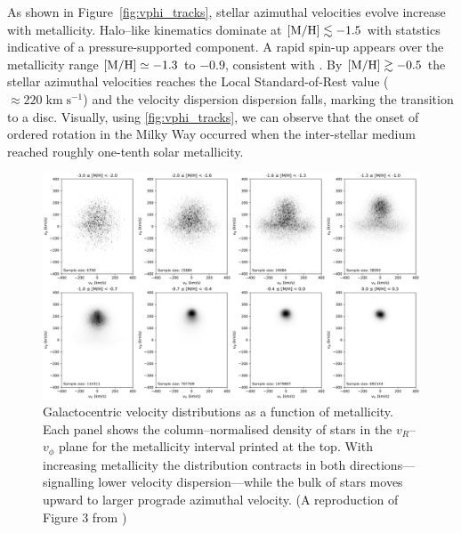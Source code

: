 \documentclass[a4paper,12pt]{article}
\begin{document}
As shown in Figure~\ref{fig:vphi_tracks}, stellar azimuthal velocities
evolve increase with metallicity.  Halo–like kinematics dominate at
${\rm [M/H]}\lesssim-1.5$ with statstics
indicative of a pressure-supported component.  A rapid spin-up appears over the 
metallicity range ${\rm [M/H]} \simeq -1.3$ to $-0.9$, consistent with \citet{Belokurov2022}.
By ${\rm [M/H]}\gtrsim-0.5$ the stellar azimuthal velocities reaches the Local
Standard-of-Rest value ($\approx220\;\mathrm{km\;s^{-1}}$) and the
velocity dispersion dispersion falls, marking the
transition to a disc.  Visually, using \ref{fig:vphi_tracks}, we can observe
that the onset of ordered rotation in the Milky Way occurred when the inter-stellar medium
reached roughly one-tenth solar metallicity.


\begin{figure}
  \centering
  \includegraphics[width=\textwidth]
                   {../figures/vphi_metallicity_histograms.png}
  \caption{Galactocentric velocity distributions as a function of metallicity.
           Each panel shows the column–normalised density of stars in the
           $v_R$–$v_\phi$ plane for the metallicity interval printed at the
           top. With increasing metallicity the distribution contracts in both
           directions—signalling lower velocity dispersion—while the bulk
           of stars moves upward to larger prograde azimuthal velocity.
           (A reproduction of Figure 3 from \citet{zhang2024existencemetalpoordiscmilky})
           }
  \label{fig:vRvphi_bins}
\end{figure}
\end{document}
